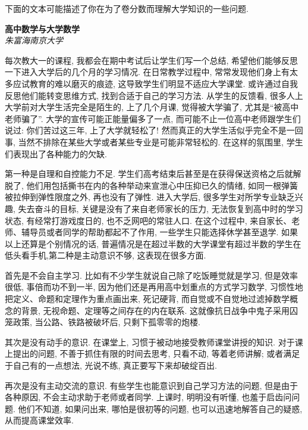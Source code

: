    下面的文本可能描述了你在为了卷分数而理解大学知识的一些问题. 
    \begin{pas}
    
        \begin{center}
            \large\textbf{高中数学与大学数学} \\
            \small \emph{朱富海}\qquad \emph{南京大学}
        \end{center}

        每次教大一的课程, 我都会在期中考试后让学生们写一个总结, 希望他们能够反思一下进入大学后的几个月的学习情况. 在日常教学过程中, 常常发现他们身上有太多应试教育的难以磨灭的痕迹, 这导致学生们明显不适应大学课堂. 或许通过自我反思他们能转变思维方式, 找到合适于自己的学习方法. 从学生的反馈看, 很多人上大学前对大学生活完全是陌生的, 上了几个月课, 觉得被大学骗了, 尤其是“被高中老师骗了”. 大学的宣传可能正能量偏多了一点, 而可能不止一位高中老师跟学生们说过: 你们苦过这三年, 上了大学就轻松了! 然而真正的大学生活似乎完全不是一回事, 当然不排除在某些大学或者某些专业是可能非常轻松的. 在这样的氛围里, 学生们表现出了各种能力的欠缺.

        第一种是自理和自控能力不足. 学生们高考结束后甚至是在获得保送资格之后就解脱了, 他们用包括撕书在内的各种举动来宣泄心中压抑已久的情绪, 如同一根弹簧被拉伸到弹性限度之外, 再也没有了弹性. 进入大学后, 很多学生对所学专业缺乏兴趣, 失去奋斗的目标, 关键是没有了来自老师家长的压力, 无法恢复到高中时的学习状态, 有经常打游戏度日的, 也不乏网吧的常驻人口. 在这个过程中, 来自家长、老师、辅导员或者同学的帮助都起不了作用, 一些学生只能选择休学甚至退学. 如果以上还算是个别情况的话, 普遍情况是在超过半数的大学课堂有超过半数的学生在低头看手机,第二种是主动意识不够, 这表现在很多方面.



        首先是不会自主学习. 比如有不少学生就说自己除了吃饭睡觉就是学习, 但是效率很低, 事倍而功不到一半, 因为他们还是再用高中划重点的方式学习数学, 习惯性地把定义、命题和定理作为重点画出来, 死记硬背, 而自觉或不自觉地过滤掉数学概念的背景, 无视命题、定理等之间存在的内在联系. 这就像抗日战争中鬼子采用囚笼政策, 当公路、铁路被破坏后, 只剩下孤零零的炮楼.
        
        
        
        其次是没有动手的意识. 在课堂上, 习惯于被动地接受教师课堂讲授的知识. 对于课上提出的问题, 不善于抓住有限的时间去思考, 只看不动, 等着老师讲解; 或者满足于自己有的一点想法, 光说不练, 真正要写下来却破绽百出.
        
        
        
        再次是没有主动交流的意识. 有些学生也能意识到自己学习方法的问题, 但是由于各种原因, 不会主动求助于老师或者同学. 上课时, 明明没有听懂, 也羞于启齿问问题. 他们不知道, 如果问出来, 哪怕是很初等的问题, 也可以迅速地解答自己的疑惑, 从而提高课堂效率.
        

\end{pas}
